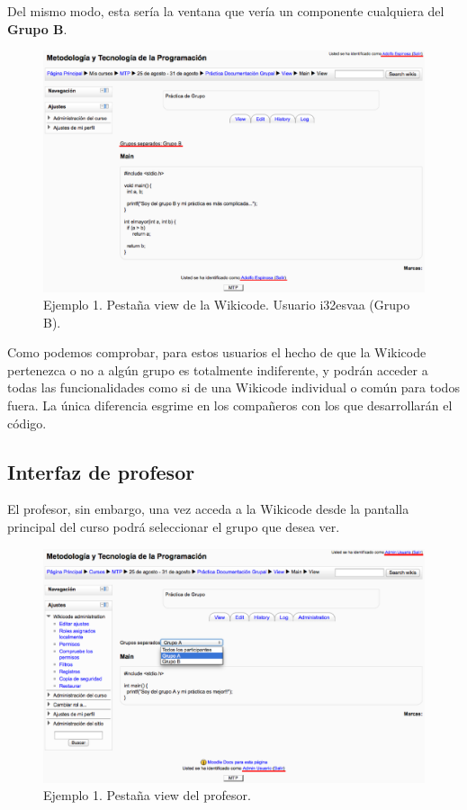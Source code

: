 Del mismo modo, esta sería la ventana que vería un componente cualquiera del \textbf{Grupo B}.

\begin{figure}[h]
	\label{fig:ej1view3}
	\includegraphics[width=\textwidth]{./img/ej1view3.eps}
	\caption{Ejemplo 1. Pestaña view de la Wikicode. Usuario i32esvaa (Grupo B).}
\end{figure}

Como podemos comprobar, para estos usuarios el hecho de que la Wikicode pertenezca o no a algún grupo es totalmente indiferente, y podrán acceder a todas las funcionalidades como si de una Wikicode individual o común para todos fuera. La única diferencia esgrime en los compañeros con los que desarrollarán el código.

\newpage

\subsection{Interfaz de profesor}

El profesor, sin embargo, una vez acceda a la Wikicode desde la pantalla principal del curso podrá seleccionar el grupo que desea ver.

\begin{figure}[h]
	\label{fig:ej1admin}
	\includegraphics[width=\textwidth]{./img/ej1admin.eps}
	\caption{Ejemplo 1. Pestaña view del profesor.}
\end{figure}

